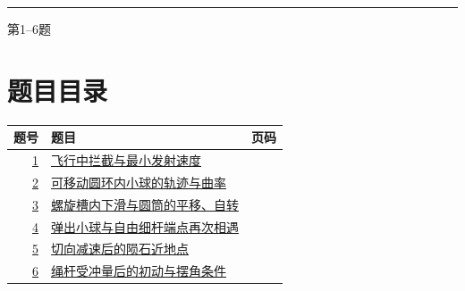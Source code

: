 \documentclass[UTF8,fontset=fandol,a4paper,11pt]{ctexart}
\begin{document}

\thispagestyle{empty}\vspace*{22mm}

\par\vspace{10mm}

\par\vspace{6mm}

\par\vspace{12mm}

\par\vspace{9mm}

\noindent\textcolor{accent}{\rule{\linewidth}{1pt}}\par\vspace{9mm}

\noindent 第1--6题\par\vfill\clearpage

\section*{题目目录}

\begin{longtable}{@{}r p{113mm} r@{}}\toprule 题号 & 题目 & 页码\\\midrule

\hyperref[q:1]{1} & \hyperref[q:1]{飞行中拦截与最小发射速度} & \pageref{q:1} \\

\hyperref[q:2]{2} & \hyperref[q:2]{可移动圆环内小球的轨迹与曲率} & \pageref{q:2} \\

\hyperref[q:3]{3} & \hyperref[q:3]{螺旋槽内下滑与圆筒的平移、自转} & \pageref{q:3} \\

\hyperref[q:4]{4} & \hyperref[q:4]{弹出小球与自由细杆端点再次相遇} & \pageref{q:4} \\

\hyperref[q:5]{5} & \hyperref[q:5]{切向减速后的陨石近地点} & \pageref{q:5} \\

\hyperref[q:6]{6} & \hyperref[q:6]{绳杆受冲量后的初动与摆角条件} & \pageref{q:6} \\

\bottomrule\end{longtable}
\end{document}

